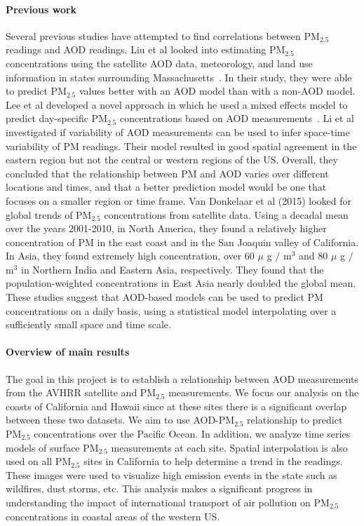 \documentclass[10pt]{article}
\begin{document}
\paragraph{Previous work} Several previous studies have attempted to find
correlations between PM$_{2.5}$ readings and AOD readings. Liu et al  looked
into estimating PM$_{2.5}$ concentrations using the satellite AOD data,
meteorology, and land use information in states surrounding
Massachusetts~\cite{Liu}. In their study, they were able to predict PM$_{2.5}$
values better with an AOD model than with a non-AOD model. Lee et al developed
a novel approach in which he used a mixed effects model to predict day-specific
PM$_{2.5}$ concentrations based on AOD measurements~\cite{lee}. Li et
al~\cite{li} investigated if variability of AOD measurements can be used to
infer space-time variability of PM readings. Their model resulted in good
spatial agreement in the eastern region but not the central or western regions
of the US. Overall, they concluded that the relationship between PM and AOD
varies over different locations and times, and that a better prediction model
would be one that focuses on a smaller region or time frame. Van Donkelaar et al (2015) looked for global trends of PM$_{2.5}$
concentrations from satellite data. Using a decadal mean over the years
2001-2010, in North America, they found a relatively higher concentration of PM
in the east coast and in the San Joaquin valley of California. In Asia, they
found extremely high concentration, over 60 $\mu$ g $/$ m$^3$ and 80 $\mu$ g
$/$ m$^3$ in Northern India and Eastern Asia, respectively. They found that the
population-weighted concentrations in East Asia nearly doubled the global mean.
These studies suggest that AOD-based models can be used to predict PM
concentrations on a daily basis, using a statistical model interpolating over a
sufficiently small space and time scale.

\paragraph{Overview of main results} The goal in this project is to establish a
relationship between AOD measurements from the AVHRR satellite and PM$_{2.5}$
measurements. We focus our analysis  on the coasts of California and Hawaii
since at these sites there is a significant overlap between these two datasets.
We aim to use AOD-PM$_{2.5}$ relationship to predict PM$_{2.5}$ concentrations
over the Pacific Ocean. In addition, we analyze time series models of surface
PM$_{2.5}$ measurements at each site. Spatial interpolation is also used on all
PM$_{2.5}$ sites in California to help determine a trend in the readings. These
images were used to visualize high emission events in the state such as
wildfires, dust storms, etc. This analysis makes a significant progress in 
understanding the impact of international transport of air pollution on
PM$_{2.5}$ concentrations in coastal areas of the western US.
\end{document}
